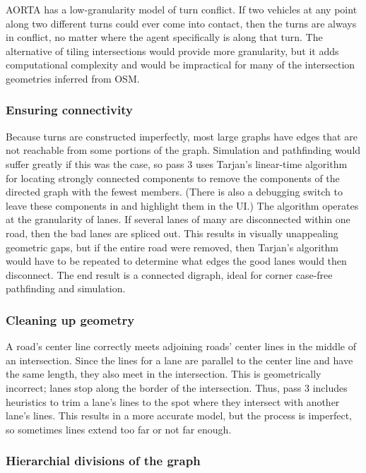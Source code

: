 \documentclass[letterpaper, 10 pt, conference]{ieeeconf}  %
\begin{document}

AORTA has a low-granularity model of turn conflict. If two vehicles at any point
along two different turns could ever come into contact, then the turns are
always in conflict, no matter where the agent specifically is along that turn.
The alternative of tiling intersections would provide more granularity, but it
adds computational complexity and would be impractical for many of the
intersection geometries inferred from OSM.

\subsubsection{Ensuring connectivity}

Because turns are constructed imperfectly, most large graphs have edges that are
not reachable from some portions of the graph. Simulation and pathfinding would
suffer greatly if this was the case, so pass 3 uses Tarjan's linear-time
algorithm for locating strongly connected components to remove the components of
the directed graph with the fewest members. (There is also a debugging switch to
leave these components in and highlight them in the UI.) The algorithm operates
at the granularity of lanes. If several lanes of many are disconnected within
one road, then the bad lanes are spliced out. This results in visually
unappealing geometric gaps, but if the entire road were removed, then Tarjan's
algorithm would have to be repeated to determine what edges the good lanes would
then disconnect. The end result is a connected digraph, ideal for corner
case-free pathfinding and simulation.

\subsubsection{Cleaning up geometry}

A road's center line correctly meets adjoining roads' center lines in the middle
of an intersection. Since the lines for a lane are parallel to the center line
and have the same length, they also meet in the intersection. This is
geometrically incorrect; lanes stop along the border of the intersection. Thus,
pass 3 includes heuristics to trim a lane's lines to the spot where they
intersect with another lane's lines. This results in a more accurate model, but
the process is imperfect, so sometimes lines extend too far or not far enough.

\subsubsection{Hierarchial divisions of the graph}
\end{document}
